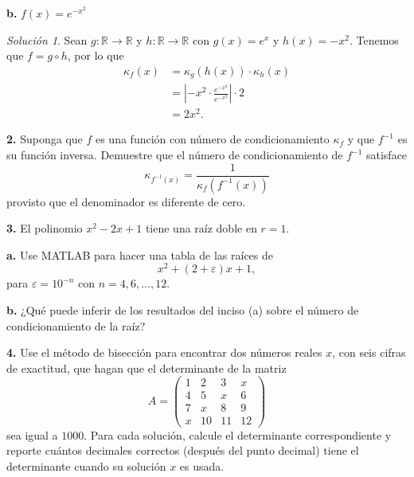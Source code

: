 \documentclass{article}
\newenvironment{statement}[1]{\smallskip\noindent\color[rgb]{1.00,0.00,0.50} {\bf #1.}}{}
\theoremstyle{definition}
\theoremstyle{remark}
\newtheorem*{solution}{Soluci\'on}
\newcommand{\BR}{\mathbb R}
\begin{document}
\begin{statement}{b}
  $f(x) = e^{-x^2}$
\end{statement}

\begin{solution}
  Sean $g: \BR \to \BR$ y $h: \BR \to \BR$ con $g(x) = e^x$ y $h(x) = -x^2$.
  Tenemos que $f = g \circ h$, por lo que
  \begin{align*}
    \kappa_f(x) &= \kappa_g(h(x)) \cdot \kappa_h(x) \\
    &= \left|-x^2 \cdot \frac{e^{-x^2}}{e^{-x^2}}\right|\cdot 2 \\
    &= 2x^2.
  \end{align*}
\end{solution}

\begin{statement}{2}
  Suponga que $f$ es una funci\'on con n\'umero de condicionamiento
  $\kappa_f$ y que $f^{-1}$ es su funci\'on inversa. Demuestre que el n\'umero
  de condicionamiento de $f^{-1}$ satisface
  \[
    \kappa_{f^{-1}(x)} = \frac{1}{\kappa_f(f^{-1}(x))}
  \]
  provisto que el denominador es diferente de cero.
\end{statement}

\begin{statement}{3}
  El polinomio $x^2 - 2x + 1$ tiene una ra\'iz doble en $r = 1$.
\end{statement}

\begin{statement}{a}
  Use MATLAB para hacer una tabla de las ra\'ices de
  \[
    x^2 + (2 + \varepsilon)x + 1,  
  \]
  para $\varepsilon = 10^{-n}$ con $n = 4, 6, \dots, 12$.
\end{statement}

\begin{statement}{b}
  ¿Qu\'e puede inferir de los resultados del inciso (a) sobre el n\'umero de
  condicionamiento de la ra\'iz?
\end{statement}

\begin{statement}{4}
  Use el m\'etodo de bisecci\'on para encontrar dos n\'umeros reales $x$, con
  seis cifras de exactitud, que hagan que el determinante de la matriz
  \[
    A = \begin{pmatrix}
      1 & 2 & 3 & x \\
      4 & 5 & x & 6 \\
      7 & x & 8 & 9 \\
      x & 10 & 11 & 12
    \end{pmatrix}  
  \]
  sea igual a $1000$. Para cada soluci\'on, calcule el determinante
  correspondiente y reporte cu\'antos decimales correctos (despu\'es del punto
  decimal) tiene el determinante cuando su soluci\'on $x$ es usada.
\end{statement}
\end{document}
